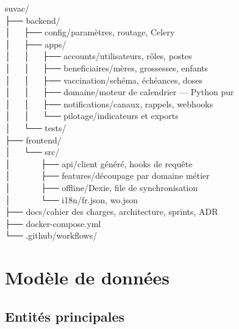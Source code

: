 \documentclass[11pt,a4paper]{article}
\begin{document}
\begin{tcolorbox}[enhanced, colback=softbg, colframe=rulegray, boxrule=0.6pt, arc=2pt,
  fontupper=\ttfamily\footnotesize, left=10pt, right=10pt, top=8pt, bottom=8pt]
suvac/\\
├── backend/\\
│~~~├── config/\hfill{\rmfamily paramètres, routage, Celery}\\
│~~~├── apps/\\
│~~~│~~~├── accounts/\hfill{\rmfamily utilisateurs, rôles, postes}\\
│~~~│~~~├── beneficiaires/\hfill{\rmfamily mères, grossesses, enfants}\\
│~~~│~~~├── vaccination/\hfill{\rmfamily schéma, échéances, doses}\\
│~~~│~~~├── domaine/\hfill{\rmfamily moteur de calendrier — Python pur}\\
│~~~│~~~├── notifications/\hfill{\rmfamily canaux, rappels, webhooks}\\
│~~~│~~~└── pilotage/\hfill{\rmfamily indicateurs et exports}\\
│~~~└── tests/\\
├── frontend/\\
│~~~└── src/\\
│~~~~~~~├── api/\hfill{\rmfamily client généré, hooks de requête}\\
│~~~~~~~├── features/\hfill{\rmfamily découpage par domaine métier}\\
│~~~~~~~├── offline/\hfill{\rmfamily Dexie, file de synchronisation}\\
│~~~~~~~└── i18n/\hfill{\rmfamily fr.json, wo.json}\\
├── docs/\hfill{\rmfamily cahier des charges, architecture, sprints, ADR}\\
├── docker-compose.yml\\
└── .github/workflows/
\end{tcolorbox}

\section{Modèle de données}

\subsection{Entités principales}
\end{document}
